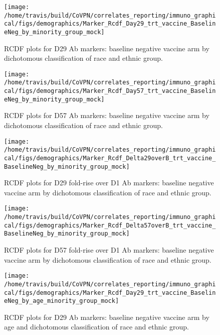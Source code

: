 \documentclass[]{book}
\theoremstyle{definition}
\theoremstyle{definition}
\theoremstyle{definition}
\newcommand{\1}{\mathbbm{1}}
\begin{document}
\begin{figure}[H]

{\centering \texttt{[image: /home/travis/build/CoVPN/correlates\_reporting/immuno\_graphical/figs/demographics/Marker\_Rcdf\_Day29\_trt\_vaccine\_BaselineNeg\_by\_minority\_group\_mock]} 

}

\caption{RCDF plots for D29 Ab markers: baseline negative vaccine arm by dichotomous classification of race and ethnic group.}\label{fig:unnamed-chunk-84}
\end{figure}

\begin{figure}[H]

{\centering \texttt{[image: /home/travis/build/CoVPN/correlates\_reporting/immuno\_graphical/figs/demographics/Marker\_Rcdf\_Day57\_trt\_vaccine\_BaselineNeg\_by\_minority\_group\_mock]} 

}

\caption{RCDF plots for D57 Ab markers: baseline negative vaccine arm by dichotomous classification of race and ethnic group.}\label{fig:unnamed-chunk-85}
\end{figure}

\begin{figure}[H]

{\centering \texttt{[image: /home/travis/build/CoVPN/correlates\_reporting/immuno\_graphical/figs/demographics/Marker\_Rcdf\_Delta29overB\_trt\_vaccine\_BaselineNeg\_by\_minority\_group\_mock]} 

}

\caption{RCDF plots for D29 fold-rise over D1 Ab markers: baseline negative vaccine arm by dichotomous classification of race and ethnic group.}\label{fig:unnamed-chunk-86}
\end{figure}

\begin{figure}[H]

{\centering \texttt{[image: /home/travis/build/CoVPN/correlates\_reporting/immuno\_graphical/figs/demographics/Marker\_Rcdf\_Delta57overB\_trt\_vaccine\_BaselineNeg\_by\_minority\_group\_mock]} 

}

\caption{RCDF plots for D57 fold-rise over D1 Ab markers: baseline negative vaccine arm by dichotomous classification of race and ethnic group.}\label{fig:unnamed-chunk-87}
\end{figure}

\begin{figure}[H]

{\centering \texttt{[image: /home/travis/build/CoVPN/correlates\_reporting/immuno\_graphical/figs/demographics/Marker\_Rcdf\_Day29\_trt\_vaccine\_BaselineNeg\_by\_age\_minority\_group\_mock]} 

}

\caption{RCDF plots for D29 Ab markers: baseline negative vaccine arm by age and dichotomous classification of race and ethnic group.}\label{fig:unnamed-chunk-88}
\end{figure}
\end{document}
